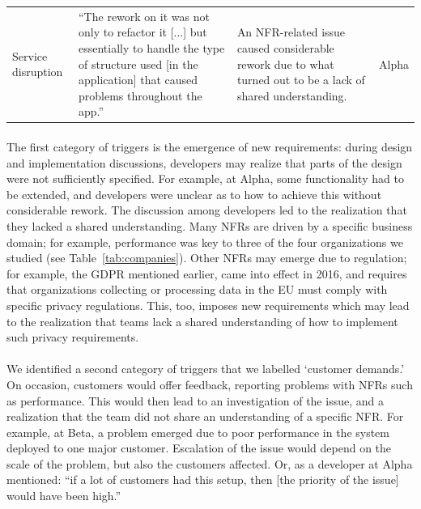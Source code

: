 \documentclass[smallextended]{svjour3}        %
\providecommand{\DIFaddtex}[1]{{\protect\color{blue}\uwave{#1}}} %
\providecommand{\DIFaddbegin}{} %
\providecommand{\DIFaddend}{} %
\providecommand{\DIFadd}[1]{\texorpdfstring{\DIFaddtex{#1}}{#1}} %
\newcommand{\DIFaddincludegraphics}[2][]{{\color{blue}\fbox{\DIFOincludegraphics[#1]{#2}}}} %
\DeclareRobustCommand{\DIFaddbegin}{\DIFOaddbegin \let\includegraphics\DIFaddincludegraphics} %
\DeclareRobustCommand{\DIFaddend}{\DIFOaddend \let\includegraphics\DIFOincludegraphics} %
\begin{document}
\begin{longtable}{P{1.5cm}p{4.8cm}p{3.3cm}p{1.3cm}}
\addlinespace
Service disruption &
``The rework on it was not only to refactor it [...] but essentially to handle the type of
structure used [in the application] that caused problems throughout the app.''
& An NFR-related issue caused considerable rework due to what turned out to be a lack of shared understanding.
& Alpha \\



\end{longtable}
\endgroup 

\DIFaddbegin \paragraph{\DIFadd{New requirements}} \DIFaddend The first category of triggers is the emergence of new requirements: during design and implementation discussions, developers may realize that parts of the design were not sufficiently specified. For example, at Alpha, some functionality had to be extended, and developers were unclear as to how to achieve this without considerable rework. The discussion among developers led to the realization that they lacked a shared understanding.
Many NFRs are driven by a specific business domain; for example, performance was key to three of the four organizations we studied (see Table~\ref{tab:companies}). Other NFRs may emerge due to regulation; for example, the 
GDPR mentioned earlier, came into effect in 2016, and requires that organizations collecting or processing data in the EU must comply with specific privacy regulations. This, too, imposes new requirements which may lead to the realization that teams lack a shared understanding of how to implement such privacy requirements.

\DIFaddbegin \paragraph{\DIFadd{Customer demands}} \DIFaddend We identified a second category of triggers that we labelled `customer demands.' On occasion, customers would offer feedback, reporting problems with NFRs such as performance. This would then lead to an investigation of the issue, and a realization that the team did not share an understanding of a specific NFR.  For example, at Beta, a problem emerged due to poor performance in the system deployed to one major customer. Escalation of the issue would depend on the scale of the problem, but also the customers affected. Or, as a developer at Alpha mentioned: \textmd{``if a lot of customers had this setup, then [the priority of the issue] would have been high.''}
\end{document}
